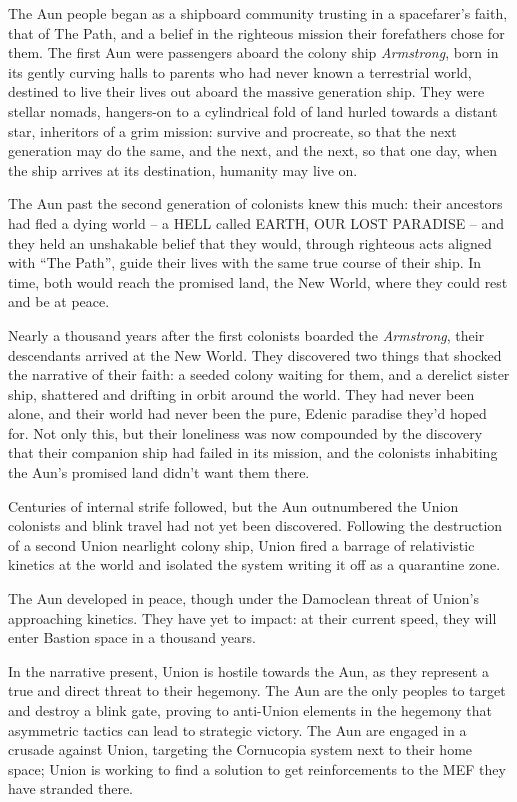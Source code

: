 The Aun people began as a shipboard community trusting in a spacefarer's faith, that of The
Path, and a belief in the righteous mission their forefathers chose for them. The first Aun were
passengers aboard the colony ship \textit{Armstrong}, born in its gently curving halls to parents who
had never known a terrestrial world, destined to live their lives out aboard the massive generation
ship. They were stellar nomads, hangers-on to a cylindrical fold of land hurled towards a distant
star, inheritors of a grim mission: survive and procreate, so that the next generation may do the
same, and the next, and the next, so that one day, when the ship arrives at its destination,
humanity may live on.

The Aun past the second generation of colonists knew this much: their ancestors had fled a
dying world -- a HELL called EARTH, OUR LOST PARADISE -- and they held an unshakable
belief that they would, through righteous acts aligned with ``The Path'', guide their lives with the
same true course of their ship. In time, both would reach the promised land, the New World,
where they could rest and be at peace.

Nearly a thousand years after the first colonists boarded the \textit{Armstrong}, their descendants
arrived at the New World. They discovered two things that shocked the narrative of their faith: a
seeded colony waiting for them, and a derelict sister ship, shattered and drifting in orbit around
the world. They had never been alone, and their world had never been the pure, Edenic paradise
they'd hoped for. Not only this, but their loneliness was now compounded by the discovery that
their companion ship had failed in its mission, and the colonists inhabiting the Aun's promised
land didn't want them there.

Centuries of internal strife followed, but the Aun outnumbered the Union colonists and blink
travel had not yet been discovered. Following the destruction of a second Union nearlight colony
ship, Union fired a barrage of relativistic kinetics at the world and isolated the system writing it
off as a quarantine zone.

The Aun developed in peace, though under the Damoclean threat of Union's approaching
kinetics. They have yet to impact: at their current speed, they will enter Bastion space in a
thousand years.

In the narrative present, Union is hostile towards the Aun, as they represent a true and direct
threat to their hegemony. The Aun are the only peoples to target and destroy a blink gate,
proving to anti-Union elements in the hegemony that asymmetric tactics can lead to strategic
victory. The Aun are engaged in a crusade against Union, targeting the Cornucopia system next
to their home space; Union is working to find a solution to get reinforcements to the MEF they
have stranded there.

